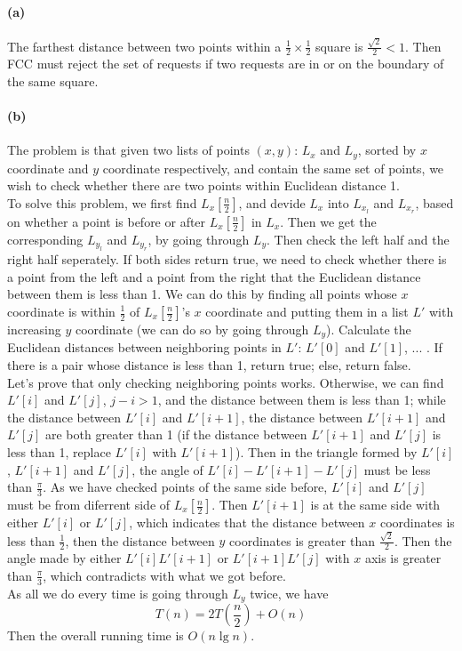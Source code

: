 \documentclass{6046}
\author{Lingfu Zhang}
\begin{document}
\paragraph{(a)}
The farthest distance between two points within a 
$\frac{1}{2}\times\frac{1}{2}$ square is 
$\frac{\sqrt{2}}{2}<1$. 
Then FCC must reject the set of requests if two requests are in or 
on the boundary of the same square. 

\paragraph{(b)}
The problem is that given two lists of points $(x,y)$: 
$L_x$ and $L_y$, sorted by $x$ coordinate and $y$ coordinate respectively, 
and contain the same set of points, 
we wish to check whether there are two points within Euclidean distance 1. 
\\
To solve this problem, we first find $L_x[\frac{n}{2}]$, 
and devide $L_x$ into $L_x_l$ and $L_x_r$, 
based on whether a point is before or after $L_x[\frac{n}{2}]$ in $L_x$. 
Then we get the corresponding $L_y_l$ and $L_y_r$, by going through 
$L_y$. 
Then check the left half and the right half seperately. 
If both sides return true, we need to check whether there is a point from the left 
and a point from the right that the Euclidean distance between them is less than 1. 
We can do this by finding all points whose $x$ coordinate is within $\frac{1}{2}$ 
of $L_x[\frac{n}{2}]$'s $x$ coordinate and putting them in a list $L'$ with 
increasing $y$ coordinate (we can do so by going through $L_y$). 
Calculate the Euclidean distances between neighboring points in $L'$: $L'[0]$ and $L'[1]$, ... . 
If there is a pair whose distance is less than 1, return true; else, return false. 
\\
Let's prove that only checking neighboring points works. 
Otherwise,  we can find $L'[i]$ and $L'[j]$, $j-i>1$, 
and the distance between them is less than 1; 
while the distance between $L'[i]$ and $L'[i+1]$, the distance between $L'[i+1]$ and $L'[j]$ are both greater than 1 
(if the distance between $L'[i+1]$ and $L'[j]$ is less than 1, replace $L'[i]$ with $L'[i+1]$). 
Then in the triangle formed by $L'[i]$, $L'[i+1]$ and $L'[j]$, the angle of 
$L'[i]-L'[i+1]-L'[j]$ must be less than $\frac{\pi}{3}$.  
As we have checked points of the same side before, 
$L'[i]$ and $L'[j]$ must be from diferrent side of $L_x[\frac{n}{2}]$. 
Then $L'[i+1]$ is at the same side with either $L'[i]$ or $L'[j]$, 
which indicates that the distance between $x$ coordinates is less than $\frac{1}{2}$, 
then the distance between $y$ coordinates is greater than $\frac{\sqrt{2}}{2}$. 
Then the angle made by either $L'[i]L'[i+1]$ or $L'[i+1]L'[j]$ with $x$ axis is greater than $\frac{\pi}{3}$, 
which contradicts with what we got before. 
\\
As all we do every time is going through $L_y$ twice, we have
$$T(n) = 2 T(\frac{n}{2}) + O(n)$$
Then the overall running time is $O(n\lg{n})$.
\end{document}
